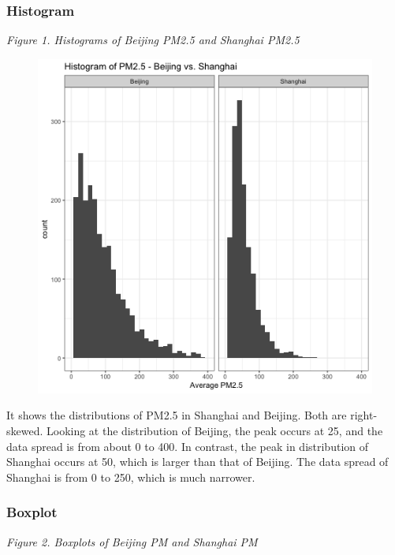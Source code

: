 \documentclass[]{article}
\begin{document}
\subsubsection{Histogram}\label{histogram}

\emph{Figure 1. Histograms of Beijing PM2.5 and Shanghai PM2.5}

\begin{figure}
\centering
\includegraphics{../results/histogram.png}
\caption{}
\end{figure}

It shows the distributions of PM2.5 in Shanghai and Beijing. Both are
right-skewed. Looking at the distribution of Beijing, the peak occurs at
25, and the data spread is from about 0 to 400. In contrast, the peak in
distribution of Shanghai occurs at 50, which is larger than that of
Beijing. The data spread of Shanghai is from 0 to 250, which is much
narrower.

\subsubsection{Boxplot}\label{boxplot}

\emph{Figure 2. Boxplots of Beijing PM and Shanghai PM}
\end{document}
